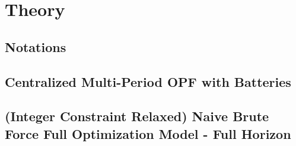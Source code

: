 \documentclass{article}
\begin{document}
\section{Theory}

\subsection{Notations}

\subsection{Centralized Multi-Period OPF with Batteries}

\subsection*{(Integer Constraint Relaxed) Naive Brute Force Full Optimization Model - Full Horizon}
\end{document}
